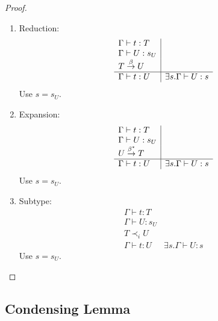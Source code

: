 \begin{theorem}
\begin{proof}
\begin{enumerate}
\begin{enumerate}
                \item Reduction:
                $$
                \begin{array}{l|l}
                    \Gamma \vdash t : T
                    \\
                    \Gamma \vdash U: s_U
                    \\
                    T \stackrel{\beta}{\to} U
                    \\
                    \hline
                    \Gamma \vdash t: U
                    &
                    \exists s. \Gamma \vdash U: s
                \end{array}
                $$
                Use $s = s_U$.

                \item Expansion:
                $$
                \begin{array}{l|l}
                    \Gamma \vdash t : T
                    \\
                    \Gamma \vdash U: s_U
                    \\
                    U \stackrel{\beta^*}{\to} T
                    \\
                    \hline
                    \Gamma \vdash t: U
                    &
                    \exists s. \Gamma \vdash U: s
                \end{array}
                $$
                Use $s = s_U$.

                \item Subtype:
                $$
                \begin{array}{l|l}
                    \Gamma \vdash t : T
                    \\
                    \Gamma \vdash U: s_U
                    \\
                    T \prec_i U
                    \\
                    \hline
                    \Gamma \vdash t: U
                    &
                    \exists s. \Gamma \vdash U: s
                \end{array}
                $$
                Use $s = s_U$.
            \end{enumerate}
        \end{enumerate}
    \end{proof}
\end{theorem}




\subsection{Condensing Lemma}


